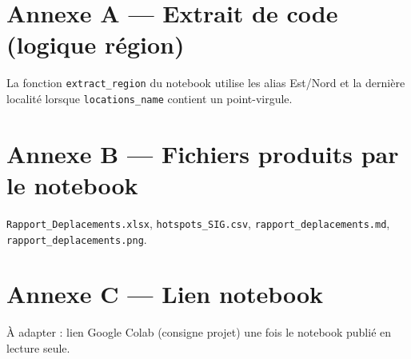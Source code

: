 \documentclass[11pt,a4paper]{report}
\begin{document}
\section*{Annexe A — Extrait de code (logique région)}
La fonction \texttt{extract\_region} du notebook utilise les alias Est/Nord et la dernière localité
lorsque \texttt{locations\_name} contient un point-virgule.

\section*{Annexe B — Fichiers produits par le notebook}
\texttt{Rapport\_Deplacements.xlsx}, \texttt{hotspots\_SIG.csv}, \texttt{rapport\_deplacements.md},
\texttt{rapport\_deplacements.png}.

\section*{Annexe C — Lien notebook}
À adapter : lien Google Colab (consigne projet) une fois le notebook publié en lecture seule.
\end{document}
